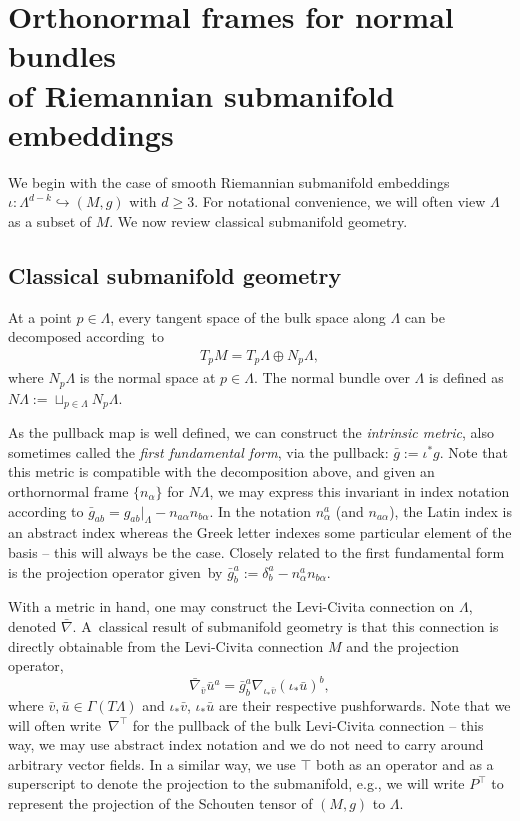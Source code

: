 \documentclass[pdftex]{sigma}
\numberwithin{equation}{section}
\renewcommand{\=}{\stackrel \Lambda =}
\begin{document}
\section[Orthonormal frames for normal bundles of Riemannian submanifold embeddings]{Orthonormal frames for normal bundles \\ of Riemannian submanifold embeddings} \label{riem-frames}

We begin with the case of smooth Riemannian submanifold embeddings $\iota \colon \Lambda^{d-k} \hookrightarrow (M,g)$ with $d \geq 3$. For notational convenience, we will often view $\Lambda$ as a subset of $M$. We now review classical submanifold geometry.

\subsection{Classical submanifold geometry}

 At a point $p \in \Lambda$, every tangent space of the bulk space along $\Lambda$ can be decomposed according~to
\begin{align} \label{TM-decomp}
T_p M = T_p \Lambda \oplus N_p \Lambda ,
\end{align}
where $N_p \Lambda$ is the normal space at $p \in \Lambda$. The normal bundle over $\Lambda$ is defined as $N \Lambda := \sqcup_{p \in \Lambda} N_p \Lambda$.

As the pullback map is well defined, we can construct the \textit{intrinsic metric}, also sometimes called the \textit{first fundamental form}, via the pullback: $\bar{g} := \iota^* g$. Note that this metric is compatible with the decomposition above, and given an orthornormal frame $\{n_{\alpha}\}$ for $N \Lambda$, we may express this invariant in index notation according to $\bar{g}_{ab} = g_{ab}|_{\Lambda} - n_{a \alpha} n_{b \alpha}$. In the notation $n^a_{\alpha}$ (and $n_{a \alpha}$), the Latin index is an abstract index whereas the Greek letter indexes some particular element of the basis -- this will always be the case. Closely related to the first fundamental form is the projection operator given~by $\bar{g}^a_b := \delta^a_b - n^a_{\alpha} n_{b \alpha}$.

With a metric in hand, one may construct the Levi-Civita connection on $\Lambda$, denoted $\bar{\nabla}$. A~classical result of submanifold geometry is that this connection is directly obtainable from the Levi-Civita connection $M$ and the projection operator,
\[
\bar{\nabla}_{\bar v} \bar{u}^a = \bar{g}^a_b \nabla_{\iota_* \bar{v}} (\iota_* \bar{u})^b ,
\]
where $\bar{v},\bar{u} \in \Gamma(T \Lambda)$ and $\iota_* \bar{v}$, $\iota_* \bar{u}$ are their respective pushforwards. Note that we will often write~$\nabla^\top$ for the pullback of the bulk Levi-Civita connection -- this way, we may use abstract index notation and we do not need to carry around arbitrary vector fields. In a similar way, we use $\top$ both as an operator and as a superscript to denote the projection to the submanifold, e.g., we will write $P^\top$ to represent the projection of the Schouten tensor of $(M,g)$ to $\Lambda$.
\end{document}
